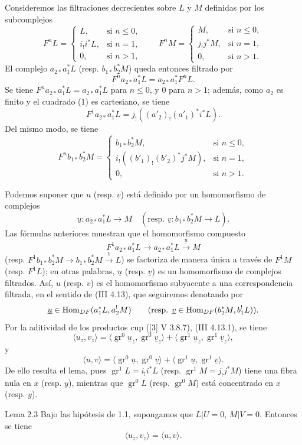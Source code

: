 Consideremos las filtraciones decrecientes sobre $L$ y $M$ definidas por los subcomplejos
\[
F^nL=
\begin{cases}
L,& \text{si } n\le 0,\\
i_!i^*L,& \text{si } n=1,\\
0,& \text{si } n>1,
\end{cases}
\qquad
F^nM=
\begin{cases}
M,& \text{si } n\le 0,\\
j_!j^*M,& \text{si } n=1,\\
0,& \text{si } n>1.
\end{cases}
\]
El complejo $a_{2*}a_1^*L$ (resp. $b_{1*}b_2^*M$) queda entonces filtrado por
\[
F^n a_{2*}a_1^*L=a_{2*}a_1^*F^nL.
\]
Se tiene $F^n a_{2*}a_1^*L=a_{2*}a_1^*L$ para $n\le 0$, y $0$ para $n>1$; además, como $a_2$ es finito y el cuadrado (1) es cartesiano, se tiene
\[
F^1a_{2*}a_1^*L=j_!((a'_2)_!(a'_1)^*i^*L).
\]
Del mismo modo, se tiene
\[
F^n b_{1*}b_2^*M=
\begin{cases}
b_{1*}b_2^*M,& \text{si } n\le 0,\\
i_!((b'_1)_!(b'_2)^*j^*M),& \text{si } n=1,\\
0,& \text{si } n>1.
\end{cases}
\]

Podemos suponer que $u$ (resp. $v$) está definido por un homomorfismo de complejos
\[
\underline{u}:a_{2*}a_1^*L\longrightarrow M
\quad
(\text{resp. }\underline{v}:b_{1*}b_2^*M\longrightarrow L).
\]
Las fórmulas anteriores muestran que el homomorfismo compuesto
\[
F^1a_{2*}a_1^*L\longrightarrow a_{2*}a_1^*L\xrightarrow{\underline{u}}M
\]
(resp. $F^1b_{1*}b_2^*M\to b_{1*}b_2^*M\xrightarrow{\underline{v}}L$) se factoriza de manera única a través de $F^1M$ (resp. $F^1L$); en otras palabras, $\underline{u}$ (resp. $\underline{v}$) es un homomorfismo de complejos filtrados. Así, $u$ (resp. $v$) es el homomorfismo subyacente a una correspondencia filtrada, en el sentido de (III 4.13), que seguiremos denotando por
\[
\underline{u}\in\operatorname{Hom}_{DF}(a_1^*L,a_2^!M)\qquad
(\text{resp. }\underline{v}\in\operatorname{Hom}_{DF}(b_2^*M,b_1^!L)).
\]
Por la aditividad de los productos cup ([3] V 3.8.7), (III 4.13.1), se tiene
\[
\langle u_z,v_z\rangle
 =\langle \operatorname{gr}^0\underline{u}_z,\operatorname{gr}^0\underline{v}_z\rangle
 +\langle \operatorname{gr}^1\underline{u}_z,\operatorname{gr}^1\underline{v}_z\rangle,
\]
y
\[
\langle u,v\rangle
 =\langle \operatorname{gr}^0\underline{u},\operatorname{gr}^0\underline{v}\rangle
 +\langle \operatorname{gr}^1\underline{u},\operatorname{gr}^1\underline{v}\rangle.
\]
De ello resulta el lema, pues $\operatorname{gr}^1L=i_!i^*L$ (resp. $\operatorname{gr}^1M=j_!j^*M$) tiene una fibra nula en $x$ (resp. $y$), mientras que $\operatorname{gr}^0L$ (resp. $\operatorname{gr}^0M$) está concentrado en $x$ (resp. $y$).

\begin{statement}{Lema 2.3}
Bajo las hipótesis de 1.1, supongamos que $L|U=0$, $M|V=0$. Entonces se tiene
\[
\langle u_z,v_z\rangle=\langle u,v\rangle .
\]
\end{statement}
